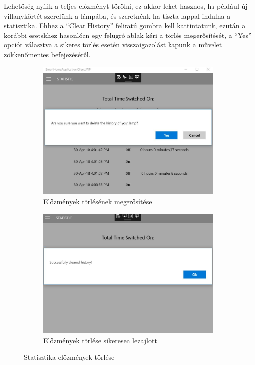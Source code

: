 \documentclass[a4paper,12pt]{report}
\begin{document}
    Lehetőség nyílik a teljes előzményt törölni, ez akkor lehet hasznos, ha például új villanykörtét szerelünk a lámpába,
    és szeretnénk ha tiszta lappal indulna a statisztika. Ehhez a ``Clear History'' feliratú gombra kell kattintatunk, ezután
    a korábbi esetekhez hasonlóan egy felugró ablak kéri a törlés megerősítését, a ``Yes'' opciót választva a sikeres törlés
    esetén visszaigazolást kapunk a művelet zökkenőmentes befejezéséről.

\begin{figure}[H]
    \centering
    \begin{subfigure}[b]{0.4\linewidth}
        \includegraphics[width=\linewidth]{images/statistichistoriydeletesure.jpg}
        \caption{Előzmények törlésének megerősítése}
    \end{subfigure}
    \begin{subfigure}[b]{0.4\linewidth}
        \includegraphics[width=\linewidth]{images/statisticdeletesucces.jpg}
        \caption{Előzmények törlése sikeresen lezajlott}
    \end{subfigure}
    \caption{Statisztika előzmények törlése}
    \label{fig:StatisticDelete}
\end{figure}
\end{document}
